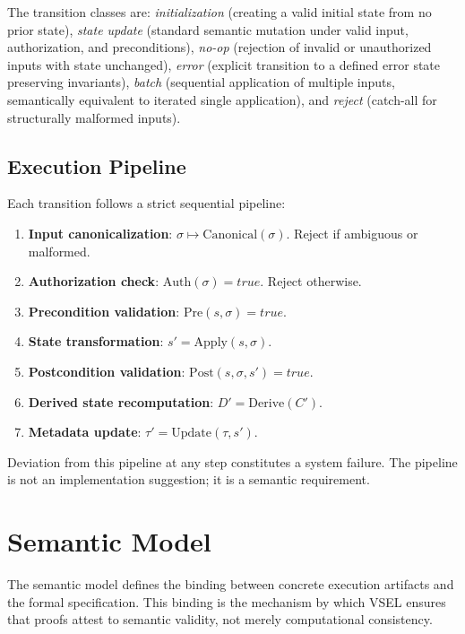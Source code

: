 \documentclass[11pt,a4paper]{article}
\theoremstyle{definition}
\newcommand{\Apply}{\mathrm{Apply}}
\newcommand{\Derive}{\mathrm{Derive}}
\newcommand{\Canonical}{\mathrm{Canonical}}
\newcommand{\Auth}{\mathrm{Auth}}
\newcommand{\Pre}{\mathrm{Pre}}
\newcommand{\Post}{\mathrm{Post}}
\begin{document}
The transition classes are: \emph{initialization} (creating a valid initial state from no prior state), \emph{state update} (standard semantic mutation under valid input, authorization, and preconditions), \emph{no-op} (rejection of invalid or unauthorized inputs with state unchanged), \emph{error} (explicit transition to a defined error state preserving invariants), \emph{batch} (sequential application of multiple inputs, semantically equivalent to iterated single application), and \emph{reject} (catch-all for structurally malformed inputs).

\subsection{Execution Pipeline}
\label{subsec:execution-pipeline}

Each transition follows a strict sequential pipeline:
\begin{enumerate}[nosep]
\item \textbf{Input canonicalization}: $\sigma \mapsto \Canonical(\sigma)$. Reject if ambiguous or malformed.
\item \textbf{Authorization check}: $\Auth(\sigma) = \mathit{true}$. Reject otherwise.
\item \textbf{Precondition validation}: $\Pre(s, \sigma) = \mathit{true}$.
\item \textbf{State transformation}: $s' = \Apply(s, \sigma)$.
\item \textbf{Postcondition validation}: $\Post(s, \sigma, s') = \mathit{true}$.
\item \textbf{Derived state recomputation}: $D' = \Derive(C')$.
\item \textbf{Metadata update}: $\tau' = \mathrm{Update}(\tau, s')$.
\end{enumerate}
Deviation from this pipeline at any step constitutes a system failure. The pipeline is not an implementation suggestion; it is a semantic requirement.

\section{Semantic Model}
\label{sec:semantic-model}

The semantic model defines the binding between concrete execution artifacts and the formal specification. This binding is the mechanism by which VSEL ensures that proofs attest to semantic validity, not merely computational consistency.
\end{document}
